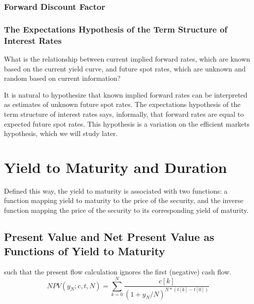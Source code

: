 \documentclass[12pt]{scrartcl}
\begin{document}
{\subsubsection{Forward Discount Factor}


\subsubsection{The Expectations Hypothesis of the Term Structure of Interest Rates}

What is the relationship between current implied forward rates, which are known based on the current yield curve, and future spot rates, which are unknown and random based on current information?

\begin{note}
    It is natural to hypothesize that known implied forward rates can be interpreted as estimates of unknown future spot rates. The expectations hypothesis of the term structure of interest rates says, informally, that forward rates are equal to expected future spot rates. This hypothesis is a variation on the efficient markets hypothesis, which we will study later.
\end{note}

\section{Yield to Maturity and Duration}


\begin{note}
    Defined this way, the yield to maturity is associated with two functions: a function mapping yield to maturity to the price of the security, and the inverse function mapping the price of the security to its corresponding yield of maturity.
\end{note}

\subsection{Present Value and Net Present Value as Functions of Yield to Maturity}

such that the present flow calculation ignores the first (negative) cash flow.
\[NPV(y_N; c, t, N) = \sum_{k=0}^N \dfrac{c[k]}{(1 + y_N / N)^{N * (t[k] - t[0])}}\]}
\end{document}
